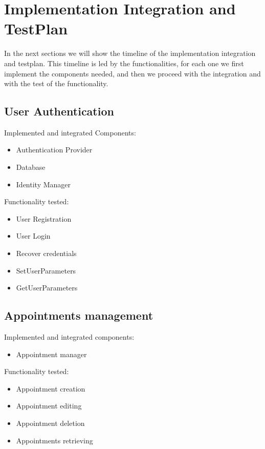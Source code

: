 \chapter{Implementation Integration and TestPlan}
In the next sections we will show the timeline of the implementation integration and testplan. This timeline is led by the functionalities, for each one we first implement the components needed, and then we proceed with the integration and with the test of the functionality.

\section{User Authentication}
Implemented and integrated Components:
\begin{itemize}
\item Authentication Provider
\item Database
\item Identity Manager
\end{itemize}
Functionality tested:
\begin{itemize}
\item User Registration
\item User Login
\item Recover credentials
\item SetUserParameters
\item GetUserParameters
\end{itemize}

\section{Appointments management}
Implemented and integrated components:
\begin{itemize}
\item Appointment manager
\end{itemize}
Functionality tested:
\begin{itemize}
\item Appointment creation
\item Appointment editing
\item Appointment deletion
\item Appointments retrieving
\end{itemize}

